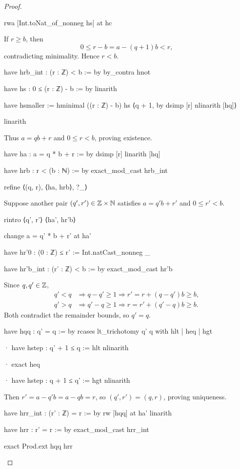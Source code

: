 \begin{proof}
\begin{lean}
      rwa [Int.toNat_of_nonneg hs] at hc
  \end{lean}

  If $r\ge b$, then
  \[
    0\le r-b=a-(q+1)b<r,
  \]
  contradicting minimality.
  Hence $r<b$.

  \begin{lean}
    have hrb_int : (r : ℤ) < b := by
      by_contra hnot

      have hs : 0 ≤ (r : ℤ) - b := by
        linarith

      have hsmaller := hminimal ((r : ℤ) - b) hs ⟨q + 1, by
        dsimp [r]
        nlinarith [hq]⟩

      linarith
  \end{lean}

  Thus $a=qb+r$ and $0\le r<b$, proving existence.

  \begin{lean}
    have ha : a = q * b + r := by
      dsimp [r]
      linarith [hq]

    have hrb : r < (b : ℕ) := by
      exact_mod_cast hrb_int

    refine ⟨(q, r), ⟨ha, hrb⟩, ?_⟩
  \end{lean}

  Suppose another pair $(q',r')\in\mathbb{Z}\times\mathbb{N}$ satisfies $a=q'b+r'$ and $0\le r'<b$.

  \begin{lean}
    rintro ⟨q', r'⟩ ⟨ha', hr'b⟩

    change a = q' * b + r' at ha'

    have hr'0 : (0 : ℤ) ≤ r' := Int.natCast_nonneg _

    have hr'b_int : (r' : ℤ) < b := by
      exact_mod_cast hr'b
  \end{lean}

  Since $q,q'\in\mathbb{Z}$,
  \[
    \begin{aligned}
      q'<q & \Longrightarrow q-q'\ge1
      \Longrightarrow r'=r+(q-q')b\ge b, \\
      q'>q & \Longrightarrow q'-q\ge1
      \Longrightarrow r=r'+(q'-q)b\ge b.
    \end{aligned}
  \]
  Both contradict the remainder bounds, so $q'=q$.

  \begin{lean}
    have hqq : q' = q := by
      rcases lt_trichotomy q' q with hlt | heq | hgt

      · have hstep : q' + 1 ≤ q := hlt
        nlinarith

      · exact heq

      · have hstep : q + 1 ≤ q' := hgt
        nlinarith
  \end{lean}

  Then $r'=a-q'b=a-qb=r$, so $(q',r')=(q,r)$, proving uniqueness.

  \begin{lean}
    have hrr_int : (r' : ℤ) = r := by
      rw [hqq] at ha'
      linarith

    have hrr : r' = r := by
      exact_mod_cast hrr_int

    exact Prod.ext hqq hrr
  \end{lean}
\end{proof}
